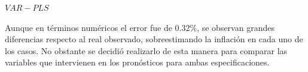 \documentclass{beamer}
\newcommand{\?}{?`}
\begin{document}
\begin{frame}{$VAR-PLS$}
  \begin{figure}[htbp]
  \end{figure}
  \medskip

  Aunque en t\'erminos num\'ericos el error fue de 0.32\%, se observan
  grandes diferencias respecto al real observado, sobreestimando la
  inflaci\'on en cada uno de los casos. No obstante se decidi\'o
  realizarlo de esta manera para comparar las variables que
  intervienen en los pron\'osticos para ambas especificaciones.
\end{frame}
\end{document}
